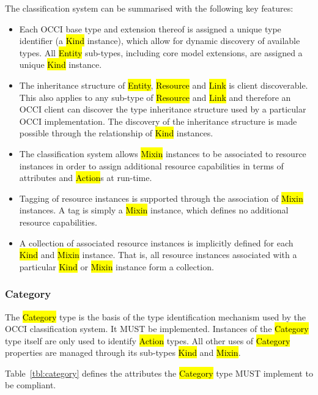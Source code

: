 \documentclass[10pt,a4paper]{article}
\begin{document}
The classification system can be summarised with the following key
features:

\begin{itemize}
  \item Each OCCI base type and extension thereof is assigned a unique
    type identifier (a \hl{Kind} instance), which allow for dynamic
    discovery of available types. All \hl{Entity} sub-types, including
    core model extensions, are assigned a unique \hl{Kind} instance.
  \item The inheritance structure of \hl{Entity}, \hl{Resource} and
    \hl{Link} is client discoverable. This also applies to any
    sub-type of \hl{Resource} and \hl{Link} and therefore an OCCI
    client can discover the type inheritance structure used by a
    particular OCCI implementation. The discovery of the inheritance
    structure is made possible through the relationship of \hl{Kind}
    instances.
  \item The classification system allows \hl{Mixin} instances to be
    associated to resource instances in order to assign additional
    resource capabilities in terms of attributes and \hl{Action}s at
    run-time.
  \item Tagging of resource instances is supported through the
    association of \hl{Mixin} instances. A tag is simply a \hl{Mixin}
    instance, which defines no additional resource capabilities.
  \item A collection of associated resource instances is implicitly
    defined for each \hl{Kind} and \hl{Mixin} instance. That is, all
    resource instances associated with a particular \hl{Kind} or
    \hl{Mixin} instance form a collection.
\end{itemize}

\subsubsection{Category}
\label{sec:category}
The \hl{Category} type is the basis of the type identification
mechanism used by the OCCI classification system. It MUST be
implemented. Instances of the \hl{Category} type itself are only used
to identify \hl{Action} types. All other uses of \hl{Category}
properties are managed through its sub-types \hl{Kind} and \hl{Mixin}.

Table~\ref{tbl:category} defines the attributes the \hl{Category} type
MUST implement to be compliant.
\end{document}
